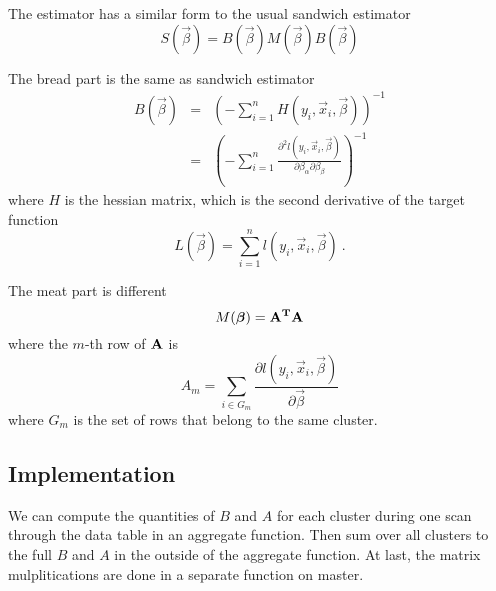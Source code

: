 The estimator has a similar form to the usual sandwich estimator
\begin{equation}
  S(\vec{\beta}) = B(\vec{\beta}) M(\vec{\beta}) B(\vec{\beta})
\end{equation}

The bread part is the same as sandwich estimator
\begin{eqnarray}
  B(\vec{\beta}) & = & \left(-\sum_{i=1}^{n} H(y_i, \vec{x}_i,
    \vec{\beta})\right)^{-1}\\
  & = & \left(-\sum_{i=1}^{n}\frac{\partial^2 l(y_i, \vec{x}_i,
      \vec{\beta})}{\partial \beta_\alpha \partial \beta_\beta}\right)^{-1}
\end{eqnarray}
where $H$ is the hessian matrix, which is the second derivative of the
target function
\begin{equation}
  L(\vec{\beta}) = \sum_{i=1}^n l(y_i, \vec{x}_i, \vec{\beta})\ .
\end{equation}

The meat part is different
\begin{equation}
  M(\vec{\beta}) = \bf{A}^T\bf{A}
\end{equation}
where the $m$-th row of $\bf{A}$ is
\begin{equation}
  A_m = \sum_{i\in G_m}\frac{\partial
      l(y_i,\vec{x}_i,\vec{\beta})}{\partial \vec{\beta}}
\end{equation}
where $G_m$ is the set of rows that belong to the same cluster.

\subsection{Implementation}

We can compute the quantities of $B$ and $A$ for each cluster during one scan
through the data table in an aggregate function. Then sum over all clusters to
the full $B$ and $A$ in the outside of the aggregate function. At last, the
matrix mulplitications are done in a separate function on master.
